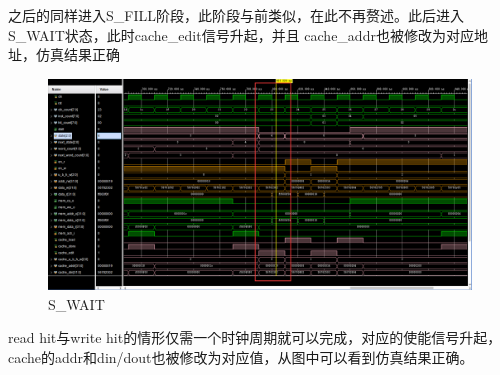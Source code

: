 之后的同样进入S\_FILL阶段，此阶段与前类似，在此不再赘述。此后进入S\_WAIT状态，此时cache\_edit信号升起，并且
cache\_addr也被修改为对应地址，仿真结果正确

\begin{figure}
    \centering
    \includegraphics[width=1.0\textwidth]{figs/sres6.png}
    \caption{S_WAIT}
    \label{Fig.9}
\end{figure}

read hit与write hit的情形仅需一个时钟周期就可以完成，对应的使能信号升起，
cache的addr和din/dout也被修改为对应值，从图中可以看到仿真结果正确。

